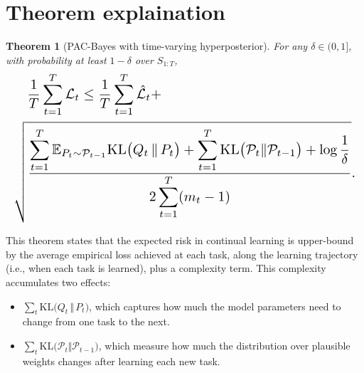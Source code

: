 \documentclass{article}
\theoremstyle{plain}
\newtheorem{theorem}{Theorem}[section]
\theoremstyle{definition}
\theoremstyle{remark}
\begin{document}
\printAffiliationsAndNotice{\icmlEqualContribution} %

 
\section{Theorem explaination}

\begin{theorem}[PAC-Bayes with time-varying hyperposterior]
\label{thm:pathwise_pac}
For any $\delta\in(0,1]$, with probability at least $1-\delta$ over $S_{1:T}$,
\begin{equation*}
\resizebox{\linewidth}{!}{$
\begin{aligned} 
&\quad\frac{1}{T} \sum_{t=1}^T \mathcal L_t
\le  
\frac{1}{T} \sum_{t=1}^T \hat{\mathcal L}_t  + \\
&
\sqrt{
\frac{
\displaystyle
\sum_{t=1}^T
\mathbb E_{P_t\sim\mathcal P_{t-1}}
\mathrm{KL}\bigl(Q_t \,\Vert\, P_t\bigr)
+
\sum_{t=1}^T
\mathrm{KL}\bigl(\mathcal P_t\Vert\mathcal P_{t-1}\bigr)
+
\log\frac{1}{\delta}}
{2\displaystyle\sum_{t=1}^T (m_t - 1)}
}.
\end{aligned}
$}
\end{equation*}
\end{theorem}

This theorem states that the expected risk in continual learning is upper-bound by the average empirical loss achieved at each task, along the learning trajectory (i.e., when each task is learned), plus a complexity term.  This complexity accumulates two effects:  

\begin{itemize}
    \item $\sum_t \mathrm{KL}\bigl(Q_t \,\Vert\, P_t\bigr)$, which captures how much the model parameters need to change from one task to the next.
    \item $\sum_t \mathrm{KL}\bigl(\mathcal P_t\Vert\mathcal P_{t-1}\bigr)$, which measure how much the distribution over plausible weights changes after learning each new task.
\end{itemize}
\end{document}
